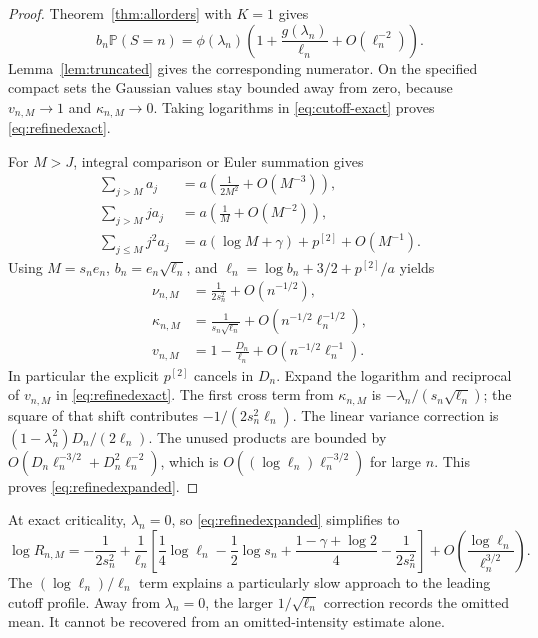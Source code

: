 \documentclass[11pt,a4paper]{article}
\numberwithin{equation}{section}
\theoremstyle{definition}
\theoremstyle{remark}
\newcommand{\Prob}{\mathbb P}
\newcommand{\ph}{\phi}
\begin{document}
\begin{proof}
Theorem~\ref{thm:allorders} with $K=1$ gives
\[
 b_n\Prob(S=n)=\ph(\lambda_n)
       \left(1+\frac{g(\lambda_n)}{\ell_n}
                   +O(\ell_n^{-2})\right).
\]
Lemma~\ref{lem:truncated} gives the corresponding numerator. On the
specified compact sets the Gaussian values stay bounded away from zero,
because $v_{n,M}\to1$ and $\kappa_{n,M}\to0$. Taking logarithms in
\eqref{eq:cutoff-exact} proves \eqref{eq:refinedexact}.

For $M>J$, integral comparison or Euler summation gives
\begin{align*}
 \sum_{j>M}a_j&=a\left(\frac1{2M^2}+O(M^{-3})\right),\\
 \sum_{j>M}j a_j&=a\left(\frac1M+O(M^{-2})\right),\\
 \sum_{j\le M}j^2a_j&=a(\log M+\gamma)+p^{[2]}+O(M^{-1}).
\end{align*}
Using $M=s_ne_n$, $b_n=e_n\sqrt{\ell_n}$, and
$\ell_n=\log b_n+3/2+p^{[2]}/a$ yields
\begin{align}
 \nu_{n,M}&=\frac1{2s_n^2}+O(n^{-1/2}),\label{eq:tail-exp}\\
 \kappa_{n,M}&=\frac1{s_n\sqrt{\ell_n}}
                    +O(n^{-1/2}\ell_n^{-1/2}),\label{eq:mean-exp}\\
 v_{n,M}&=1-\frac{D_n}{\ell_n}
                    +O(n^{-1/2}\ell_n^{-1}).\label{eq:var-exp}
\end{align}
In particular the explicit $p^{[2]}$ cancels in $D_n$. Expand the
logarithm and reciprocal of $v_{n,M}$ in \eqref{eq:refinedexact}.
The first cross term from $\kappa_{n,M}$ is
$-\lambda_n/(s_n\sqrt{\ell_n})$; the square of that shift contributes
$-1/(2s_n^2\ell_n)$. The linear variance correction is
$(1-\lambda_n^2)D_n/(2\ell_n)$. The unused products are bounded by
$O(D_n\ell_n^{-3/2}+D_n^2\ell_n^{-2})$, which is
$O((\log\ell_n)\ell_n^{-3/2})$ for large $n$.
This proves \eqref{eq:refinedexpanded}.
\end{proof}

At exact criticality, $\lambda_n=0$, so \eqref{eq:refinedexpanded}
simplifies to
\begin{equation}\label{eq:criticalcutoffcorrection}
 \log R_{n,M}=-\frac1{2s_n^2}
 +\frac1{\ell_n}\left[
       \frac14\log\ell_n-\frac12\log s_n
       +\frac{1-\gamma+\log2}{4}-\frac1{2s_n^2}\right]
 +O\left(\frac{\log\ell_n}{\ell_n^{3/2}}\right).
\end{equation}
The $(\log\ell_n)/\ell_n$ term explains a particularly slow approach
to the leading cutoff profile. Away from $\lambda_n=0$, the larger
$1/\sqrt{\ell_n}$ correction records the omitted mean. It cannot be
recovered from an omitted-intensity estimate alone.
\end{document}

